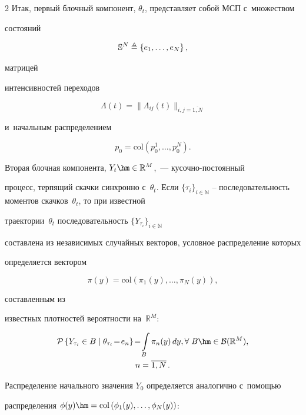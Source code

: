 \begin{multicols}{2}
Итак, первый блочный компонент, $\theta_t$, пред\-став\-ля\-ет собой МСП с~множеством 


состояний 


$$


\mathbb{S}^N \ebd  \left\{e_1, \ldots, e_N\right\},


$$


 матрицей 


интенсивностей переходов 


$$


\Lambda(t)=\|\Lambda_{ij}(t)\|_{i,j=\overline{1,N}}


$$ 


и~начальным распределением 


$$


p_0=\mathrm{col}\left(p_0^1,\ldots,p_0^N\right).


$$


Вторая блочная компонента,  $Y_t \hm\in \mathbb{R}^M$,~--- ку\-соч\-но-по\-сто\-ян\-ный 


процесс, терпящий скачки синхронно с~$\theta_t$. Если $\{\tau_i\}_{i \in 


\mathbb{N}}$ -- последовательность моментов скачков~$\theta_t$, то при известной 


траектории~$\theta_t$ последовательность $\{Y_{\tau_i}\}_{i \in \mathbb{N}}$ 


составлена из независимых случайных векторов, условное распределение которых 


определяется вектором 


$$


\pi(y) = \mathrm{col}\left(\pi_1(y),\ldots,\pi_N(y)\right),


$$


 составленным из 


известных плотностей ве\-ро\-ят\-ности на~$\mathbb{R}^M$:


\begin{multline*}


\pp{Y_{\tau_i}\in B\;|\;\theta_{\tau_i}\! =\! e_n}\! =\! \int\limits_{B} \pi_n(y)\,dy, \forall


\;B \hm\in \mathcal{B}(\mathbb{R}^M),\\


  n=\overline{1,N}\,.


\end{multline*}


Распределение начального значения $Y_0$ определяется аналогично с~по\-мощью 


распределения $\phi(y) \hm= \mathrm{col}\,(\phi_1(y),\ldots,\phi_N(y))$:



\end{multicols}
